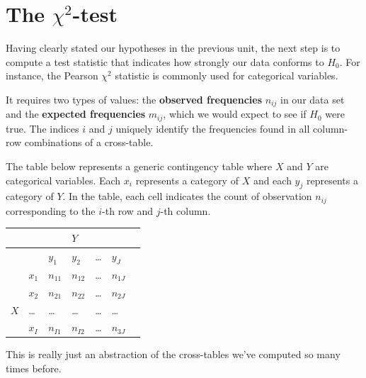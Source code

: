 \documentclass[
  11pt,
  letterpaper,
  DIV=11,
  numbers=noendperiod]{scrreprt}
\begin{document}
\section{\texorpdfstring{The
\(\chi^2\)-test}{The \textbackslash chi\^{}2-test}}\label{the-chi2-test}

Having clearly stated our hypotheses in the previous unit, the next step
is to compute a test statistic that indicates how strongly our data
conforms to \(H_0\). For instance, the Pearson \(\chi^2\) statistic is
commonly used for categorical variables.

It requires two types of values: the \textbf{observed frequencies}
\(n_{ij}\) in our data set and the \textbf{expected frequencies}
\(m_{ij}\), which we would expect to see if \(H_0\) were true. The
indices \(i\) and \(j\) uniquely identify the frequencies found in all
column-row combinations of a cross-table.

\begin{tcolorbox}[enhanced jigsaw, toprule=.15mm, opacitybacktitle=0.6, coltitle=black, arc=.35mm, colback=white, title=\textcolor{quarto-callout-note-color}{\faInfo}\hspace{0.5em}{Mathematical details: The structure of a contingency table}, titlerule=0mm, toptitle=1mm, bottomtitle=1mm, breakable, rightrule=.15mm, opacityback=0, bottomrule=.15mm, leftrule=.75mm, colframe=quarto-callout-note-color-frame, left=2mm, colbacktitle=quarto-callout-note-color!10!white]

The table below represents a generic contingency table where \(X\) and
\(Y\) are categorical variables. Each \(x_i\) represents a category of
\(X\) and each \(y_j\) represents a category of \(Y\). In the table,
each cell indicates the count of observation \(n_{ij}\) corresponding to
the \(i\)-th row and \(j\)-th column.

\begin{longtable}[]{@{}lllllll@{}}
\toprule\noalign{}
& & & \(Y\) & & & \\
\midrule\noalign{}
\endhead
\bottomrule\noalign{}
\endlastfoot
& & \(y_1\) & \(y_2\) & \ldots{} & \(y_J\) & \\
& \(x_1\) & \(n_{11}\) & \(n_{12}\) & \ldots{} & \(n_{1J}\) & \\
& \(x_2\) & \(n_{21}\) & \(n_{22}\) & \ldots{} & \(n_{2J}\) & \\
\(X\) & \ldots{} & \ldots{} & \ldots{} & \ldots{} & \ldots{} & \\
& \(x_I\) & \(n_{I1}\) & \(n_{I2}\) & \ldots{} & \(n_{3J}\) & \\
\end{longtable}

This is really just an abstraction of the cross-tables we've computed so
many times before.

\end{tcolorbox}
\end{document}
